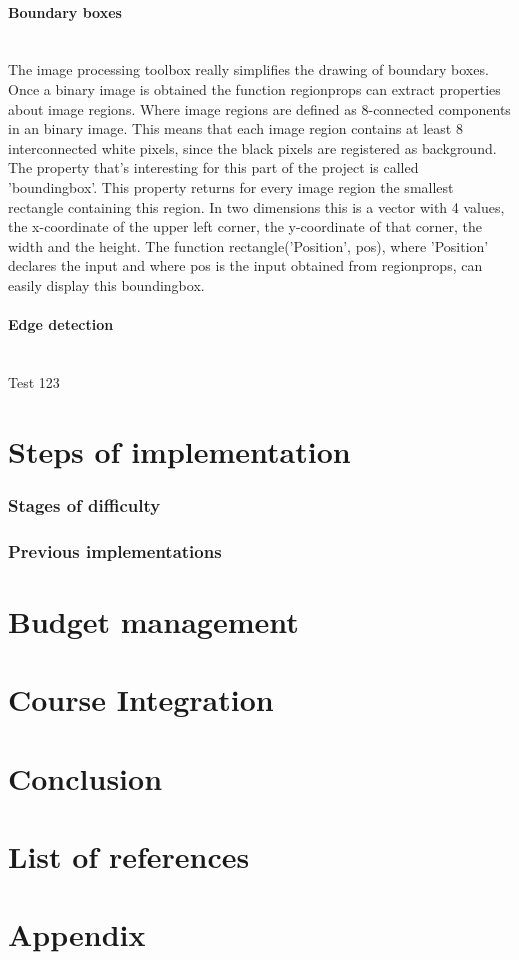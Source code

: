 \documentclass[11pt]{article}
\begin{document}
\paragraph{Boundary boxes}\mbox{}\\
The image processing toolbox really simplifies the drawing of boundary boxes. Once a binary image is obtained the function regionprops can extract properties about image regions. Where image regions are defined as 8-connected components in an binary image. This means that each image region contains at least 8 interconnected white pixels, since the black pixels are registered as background. The property that's interesting for this part of the project is called 'boundingbox'. This property returns for every image region the smallest rectangle containing this region. In two dimensions this is a vector with 4 values, the x-coordinate of the upper left corner, the y-coordinate of that corner, the width and the height. The function rectangle('Position', pos), where 'Position' declares the input and where pos is the input obtained from regionprops, can easily display this boundingbox. 

\paragraph{Edge detection}\mbox{}\\
Test 123

\section{Steps of implementation}

\subsubsection{Stages of difficulty}

\subsubsection{Previous implementations}

\section{Budget management}

\section{Course Integration}

\section{Conclusion}

\section{List of references}

\section{Appendix}
\end{document}

